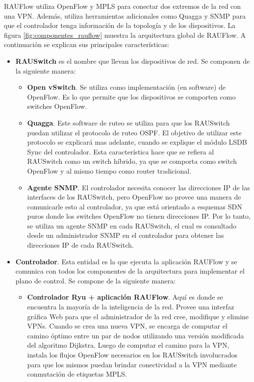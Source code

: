 RAUFlow utiliza OpenFlow y MPLS para conectar dos extremos de la red con una VPN. Además, utiliza herramientas adicionales como Quagga y SNMP para que el controlador tenga información de la topología y de los dispositivos. La figura \ref{fig:componentes_rauflow} muestra la arquitectura global de RAUFlow. A continuación se explican sus principales características:
\begin{itemize}
	\item \textbf{RAUSwitch} es el nombre que llevan los dispositivos de red. Se componen de la siguiente manera:
		\begin{itemize}
			\item \textbf{Open vSwitch}. Se utiliza como implementación (en software) de OpenFlow. Es lo que permite que los dispositivos se comporten como switches OpenFlow.
			\item \textbf{Quagga}. Este software de ruteo se utiliza para que los RAUSwitch puedan utilizar el protocolo de ruteo OSPF. El objetivo de utilizar este protocolo se explicará mas adelante, cuando se explique el módulo LSDB Sync del controlador. Esta característica hace que se refiera al RAUSwitch como un switch híbrido, ya que se comporta como switch OpenFlow y al mismo tiempo como router tradicional.
			\item \textbf{Agente SNMP}. El controlador necesita conocer las direcciones IP de las interfaces de los RAUSwitch, pero OpenFlow no provee una manera de comunicarle esto al controlador, ya que está orientado a esquemas SDN puros donde los switches OpenFlow no tienen direcciones IP. Por lo tanto, se utiliza un agente SNMP en cada RAUSwitch, el cual es consultado desde un administrador SNMP en el controlador para obtener las direcciones IP de cada RAUSwitch.
		\end{itemize}
	\item \textbf{Controlador}. Esta entidad es la que ejecuta la aplicación RAUFlow y se comunica con todos los componentes de la arquitectura para implementar el plano de control. Se compone de la siguiente manera:
		\begin{itemize}
			\item \textbf{Controlador Ryu + aplicación RAUFlow}. Aquí es donde se encuentra la mayoría de la inteligencia de la red. Provee una interfaz gráfica Web para que el administrador de la red cree, modifique y elimine VPNs. Cuando se crea una nueva VPN, se encarga de computar el camino óptimo entre un par de nodos utilizando una versión modificada del algoritmo Dijkstra. Luego de computar el camino para la VPN, instala los flujos OpenFlow necesarios en los RAUSwitch involucrados para que los mismos puedan brindar conectividad a la VPN mediante conmutación de etiquetas MPLS.

\end{itemize}
\end{itemize}
